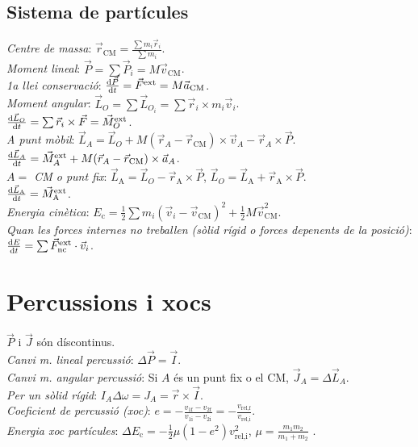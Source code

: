 \documentclass[11pt]{article}
\newcommand{\lp}{\left(}
\newcommand{\rp}{\right)}
\newcommand{\ci}{\textbullet\;}
\begin{document}
\begin{multicols}{4}
\subsection{Sistema de part\'icules}
\emph{Centre de massa}: $\vec{r}_{\text{CM}} = \frac{\sum m_i \vec{r}_i}{\sum m_i}$. \\
\emph{Moment lineal}: $\vec{P} = \sum \vec{P}_i = M\vec{v}_{\text{CM}}$. \\
\emph{1a llei conservaci\'o}: $\frac{\dif \vec{P}}{\dif t} = \vec{F}^{\text{ext}} = 
  M \vec{a}_\text{CM}$. \\
\emph{Moment angular}: $\vec{L}_O = \sum \vec{L}_{O_i} = \sum \vec{r}_i \times m_i\vec{v}_i$. \\
\ci $\frac{\dif \vec{L}_O}{\dif t} = \sum \vec{r}_i\times\vec{F} = \vec{M}_O^{\text{ext}}$. \\
\emph{A punt m\`obil}: $\vec{L}_A = \vec{L}_O + M(\vec{r}_A - \vec{r}_{\text{CM}}) \times \vec{v}_A - \vec{r}_A\times\vec{P}$. \\
\ci $\frac{\dif \vec{L}_A}{\dif t} = \vec{M}_A^{\text{ext}} + M(\vec{r}_A - \vec{r}_{\text{CM}})\times \vec{a}_A$. \\
\emph{$A =$ CM o punt fix}: $\vec{L}_{\text{A}} = \vec{L}_O - \vec{r}_{\text{A}}\times\vec{P}$, $\vec{L}_O = \vec{L}_{\text{A}} + \vec{r}_{\text{A}}\times\vec{P}$. \\
\ci $\frac{\dif \vec{L}_{\text{A}}}{\dif t} = \vec{M}_{\text{A}}^{\text{ext}}$. \\
\emph{Energia cinètica}: $E_{\text{c}} = \frac{1}{2} \sum m_i (\vec{v}_i - \vec{v}_{\text{CM}})^2 + \frac{1}{2}  M\vec{v}_{\text{CM}}^2$.\\
\emph{Quan les forces internes no treballen (sòlid rígid o forces depenents de la posició)}: $\frac{\dif E}{\dif t}  =\sum \vec{F}^{\text{ext}}_\text{nc}\cdot\vec{v}_i$. \\


\section{Percussions i xocs}
$\vec{P}$ i $\vec{J}$ són díscontinus.\\
\emph{Canvi m. lineal percussió}: $\Delta \vec{P} = \vec{I}$.\\
\emph{Canvi m. angular percussió}: Si $A$ és un punt fix o el CM, $\vec{J}_A = \Delta \vec{L}_A$.\\
\emph{Per un sòlid rígid}: $I_A \Delta \omega = J_A = \vec{r}\times \vec{I}$.\\
\emph{Coeficient de percussió (xoc)}: $e = - \frac{v_{1\text{f}} - v_{2\text{f}}}{v_{1\text{i}} - v_{2\text{i}}}=-\frac{v_{\text{rel,f}}}{v_{\text{rel,i}}}$.\\
\emph{Energia xoc partícules}: $\Delta E_\text{c} = -\frac{1}{2} \mu \lp 1 - e^2 \rp v_\text{rel,i}^2$, $\mu=\frac{m_1m_2}{m_1+m_2}$ .\\




\end{multicols}
\end{document}
